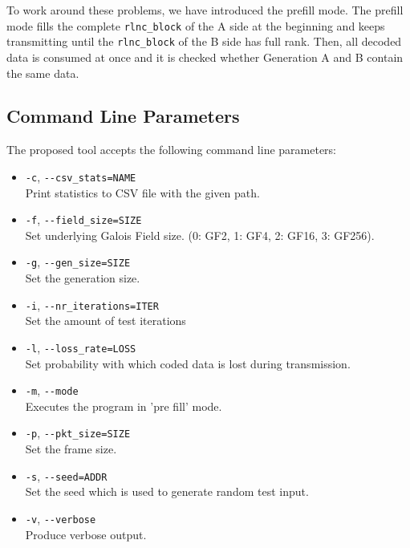 \documentclass[a4paper,english,10pt]{tumarticle}
\begin{document}
To work around these problems, we have introduced the prefill mode.
The prefill mode fills the complete \texttt{rlnc\_block} of the A side at the beginning and keeps transmitting until the 
\texttt{rlnc\_block} of the B side has full rank. Then, all decoded data is consumed at once and it is checked 
whether Generation A and B contain the same data.

\subsection{Command Line Parameters}\label{app:cmd}
The proposed tool accepts the following command line parameters:

\begin{itemize}
    \item \texttt{-c}, \texttt{-{}-csv\_stats=NAME}\\
    Print statistics to CSV file with the given path.

    \item \texttt{-f}, \texttt{-{}-field\_size=SIZE}\\
    Set underlying Galois Field size. (0: GF2, 1: GF4, 2: GF16, 3: GF256).

    \item \texttt{-g}, \texttt{-{}-gen\_size=SIZE}\\
    Set the generation size.

    \item \texttt{-i}, \texttt{-{}-nr\_iterations=ITER}\\
    Set the amount of test iterations

    \item \texttt{-l}, \texttt{-{}-loss\_rate=LOSS}\\
    Set probability with which coded data is lost during transmission.

    \item \texttt{-m}, \texttt{-{}-mode}\\
    Executes the program in 'pre fill' mode.

    \item \texttt{-p}, \texttt{-{}-pkt\_size=SIZE}\\
    Set the frame size.

    \item \texttt{-s}, \texttt{-{}-seed=ADDR}\\
    Set the seed which is used to generate random test input.

    \item \texttt{-v}, \texttt{-{}-verbose}\\
    Produce verbose output.
\end{itemize}
\end{document}
